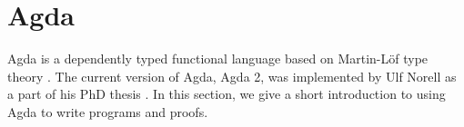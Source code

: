 \section{Agda}
\label{Agda}
Agda is a dependently typed functional language based on Martin-Löf type theory \cite{Martin-Löf}. The current version of Agda, Agda 2, was implemented by Ulf Norell as a part of his PhD thesis \cite{NorellAgda}.
In this section, we give a short introduction to using Agda to write programs and proofs.

